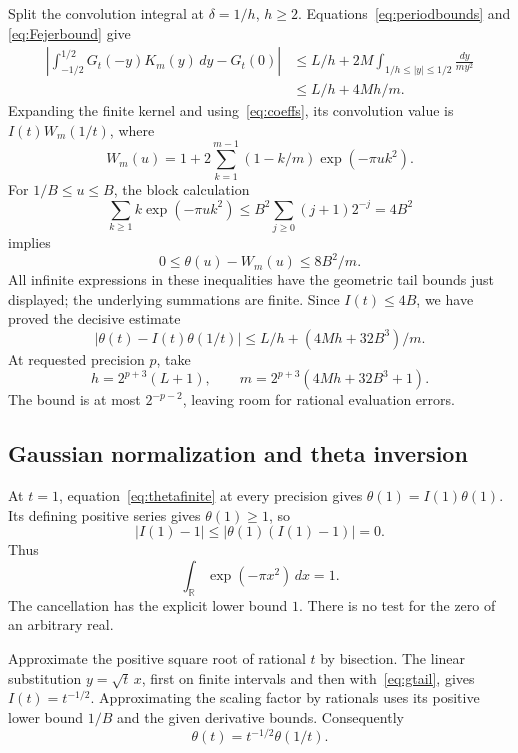 \documentclass[11pt,letterpaper]{article}
\numberwithin{equation}{section}
\theoremstyle{definition}
\newcommand{\R}{\mathbb R}
\begin{document}
Split the convolution integral at \(\delta=1/h\), \(h\ge2\).
Equations~\eqref{eq:periodbounds} and \eqref{eq:Fejerbound}
give
\begin{align}
 \left|\int_{-1/2}^{1/2}G_t(-y)K_m(y)\,dy-G_t(0)\right|
 &\le L/h+2M\int_{1/h\le|y|\le1/2}\frac{dy}{my^2}\\
 &\le L/h+4Mh/m.                                         \label{eq:Fejererror}
\end{align}
Expanding the finite kernel and using~\eqref{eq:coeffs}, its
convolution value is \(I(t)W_m(1/t)\), where
\[
 W_m(u)=1+2\sum_{k=1}^{m-1}(1-k/m)\exp(-\pi uk^2).
\]
For \(1/B\le u\le B\), the block calculation
\[
 \sum_{k\ge1}k\exp(-\pi uk^2)
       \le B^2\sum_{j\ge0}(j+1)2^{-j}=4B^2
\]
implies
\[
       0\le\theta(u)-W_m(u)\le8B^2/m.
\]
All infinite expressions in these inequalities have the geometric
tail bounds just displayed; the underlying summations are finite.
Since \(I(t)\le4B\), we have proved the decisive estimate
\begin{equation}
 \boxed{|\theta(t)-I(t)\theta(1/t)|
              \le L/h+(4Mh+32B^3)/m.}                    \label{eq:thetafinite}
\end{equation}
At requested precision \(p\), take
\begin{equation}
 h=2^{p+3}(L+1),\qquad
 m=2^{p+3}(4Mh+32B^3+1).                                 \label{eq:Fejercutoffs}
\end{equation}
The bound is at most \(2^{-p-2}\), leaving room for rational
evaluation errors.

\subsection{Gaussian normalization and theta inversion}

At \(t=1\), equation~\eqref{eq:thetafinite} at every precision
gives \(\theta(1)=I(1)\theta(1)\). Its defining positive series
gives \(\theta(1)\ge1\), so
\[
 |I(1)-1|\le |\theta(1)(I(1)-1)|=0.
\]
Thus
\begin{equation}
                  \int_\R\exp(-\pi x^2)\,dx=1.            \label{eq:gaussiannormal}
\end{equation}
The cancellation has the explicit lower bound \(1\).
There is no test for the zero of an arbitrary real.

Approximate the positive square root of rational \(t\) by bisection.
The linear substitution \(y=\sqrt t\,x\), first on finite intervals
and then with~\eqref{eq:gtail}, gives \(I(t)=t^{-1/2}\).
Approximating the scaling factor by rationals uses its positive
lower bound \(1/B\) and the given derivative bounds.
Consequently
\begin{equation}
             \boxed{\theta(t)=t^{-1/2}\theta(1/t).}         \label{eq:theta}
\end{equation}
\end{document}
